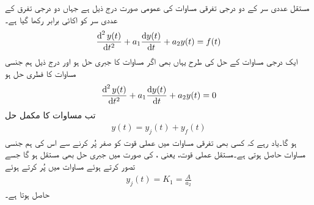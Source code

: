 مستقل عددی سر کے دو درجی تفرقی مساوات کی عمومی صورت درج ذیل ہے جہاں دو درجی تفرق کے عددی سر کو اکائی برابر رکھا گیا ہے۔
\begin{align}\label{مساوات_عارضی_دو_درجی_عمومی_الف}
\frac{\dif^{\,2} y(t)}{\dif t^2}+a_1\frac{\dif y(t)}{\dif t}+a_2 y(t)=f(t)
\end{align}
ایک درجی مساوات کے حل کی طرح یہاں بھی اگر مساوات  کا جبری حل  ہو اور درج ذیل ہم جنسی مساوات کا فطری حل  ہو
 \begin{align}\label{مساوات_عارضی_دو_درجی_عمومی_ہم_جنسی_الف}
\frac{\dif^{\,2} y(t)}{\dif t^2}+a_1\frac{\dif y(t)}{\dif t}+a_2 y(t)=0
\end{align}
تب مساوات  کا مکمل حل
\begin{align}
y(t)=y_j(t)+y_f(t)
\end{align}
ہو گا۔یاد رہے کہ کسی بھی تفرقی مساوات میں عملی قوت کو صفر  پُر کرنے سے اس کی ہم جنسی مساوات حاصل ہوتی ہے۔مستقل عملی قوت، یعنی ، کی صورت میں جبری حل بھی مستقل ہو گا جسے  تصور کرتے ہوئے مساوات  میں پُر کرتے ہوئے
\begin{align}
y_j(t)=K_1=\frac{A}{a_2}
\end{align}
حاصل ہوتا ہے۔

